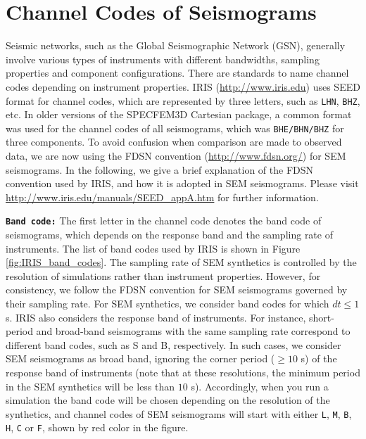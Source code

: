 \chapter{Channel Codes of Seismograms}\label{cha:channel-codes}

Seismic networks, such as the Global Seismographic Network (GSN),
generally involve various types of instruments with different bandwidths,
sampling properties and component configurations. There are standards
to name channel codes depending on instrument properties. IRIS (\url{http://www.iris.edu})
uses SEED format for channel codes, which are represented by three
letters, such as \texttt{LHN}, \texttt{BHZ}, etc. In older versions
of the SPECFEM3D Cartesian package, a common format was used for the
channel codes of all seismograms, which was \texttt{BHE/BHN/BHZ} for
three components. To avoid confusion when comparison are made to observed
data, we are now using the FDSN convention (\url{http://www.fdsn.org/})
for SEM seismograms. In the following, we give a brief explanation
of the FDSN convention used by IRIS, and how it is adopted in SEM
seismograms. Please visit \url{http://www.iris.edu/manuals/SEED_appA.htm}
for further information.\newline


\noindent \texttt{\textbf{Band code:}} The first letter in the channel
code denotes the band code of seismograms, which depends on the response
band and the sampling rate of instruments. The list of band codes
used by IRIS is shown in Figure \ref{fig:IRIS_band_codes}. The sampling
rate of SEM synthetics is controlled by the resolution of simulations
rather than instrument properties. However, for consistency, we follow
the FDSN convention for SEM seismograms governed by their sampling
rate. For SEM synthetics, we consider band codes for which $dt\leq1$
s. IRIS also considers the response band of instruments. For instance,
short-period and broad-band seismograms with the same sampling rate
correspond to different band codes, such as S and B, respectively.
In such cases, we consider SEM seismograms as broad band, ignoring
the corner period ($\geq10$ s) of the response band of instruments
(note that at these resolutions, the minimum period in the SEM synthetics
will be less than $10$ s). Accordingly, when you run a simulation
the band code will be chosen depending on the resolution of the synthetics,
and channel codes of SEM seismograms will start with either \texttt{L},
\texttt{M}, \texttt{B}, \texttt{H}, \texttt{C} or \texttt{F}, shown
by red color in the figure.\newline


